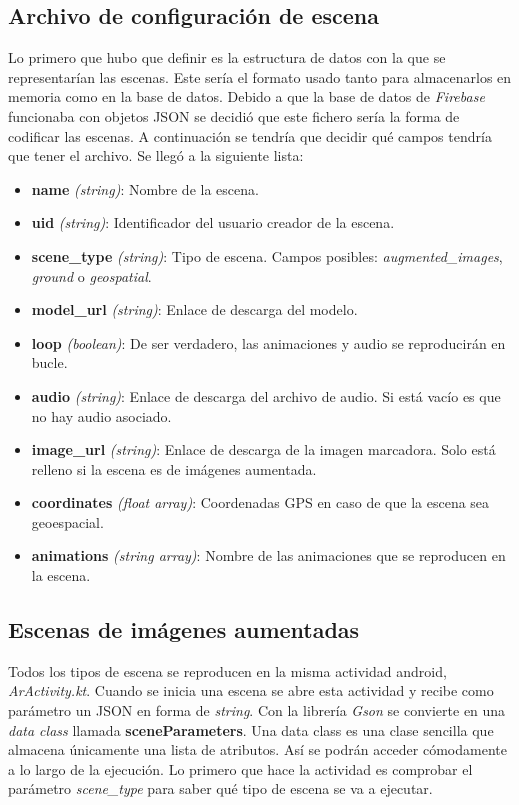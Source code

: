 
\subsection{Archivo de configuración de escena}

Lo primero que hubo que definir es la estructura de datos con la que se representarían las escenas. Este sería el formato usado tanto para almacenarlos en memoria como en la base de datos. Debido a que la base de datos de \textit{Firebase} funcionaba con objetos JSON se decidió que este fichero sería la forma de codificar las escenas. A continuación se tendría que decidir qué campos tendría que tener el archivo. Se llegó a la siguiente lista:

\begin{itemize}
    \item \textbf{name} \textit{(string)}: Nombre de la escena.
    \item \textbf{uid} \textit{(string)}: Identificador del usuario creador de la escena.
    \item \textbf{scene\_type} \textit{(string)}: Tipo de escena. Campos posibles: \textit{augmented\_images}, \textit{ground} o \textit{geospatial}.
    \item \textbf{model\_url} \textit{(string)}: Enlace de descarga del modelo.
    \item \textbf{loop} \textit{(boolean)}: De ser verdadero, las animaciones y audio se reproducirán en bucle.
    \item \textbf{audio} \textit{(string)}: Enlace de descarga del archivo de audio. Si está vacío es que no hay audio asociado.
    \item \textbf{image\_url} \textit{(string)}: Enlace de descarga de la imagen marcadora. Solo está relleno si la escena es de imágenes aumentada.
    \item \textbf{coordinates} \textit{(float array)}: Coordenadas GPS en caso de que la escena sea geoespacial.
    \item \textbf{animations} \textit{(string array)}: Nombre de las animaciones que se reproducen en la escena.
\end{itemize}

\subsection{Escenas de imágenes aumentadas}

Todos los tipos de escena se reproducen en la misma actividad android, \textit{ArActivity.kt}. Cuando se inicia una escena se abre esta actividad y recibe como parámetro un JSON en forma de \textit{string}. Con la librería \textit{Gson}\cite{gson} se convierte en una \textit{data class} llamada \textbf{sceneParameters}. Una data class es una clase sencilla que almacena únicamente una lista de atributos. Así se podrán acceder cómodamente a lo largo de la ejecución. Lo primero que hace la actividad es comprobar el parámetro \textit{scene\_type} para saber qué tipo de escena se va a ejecutar.

